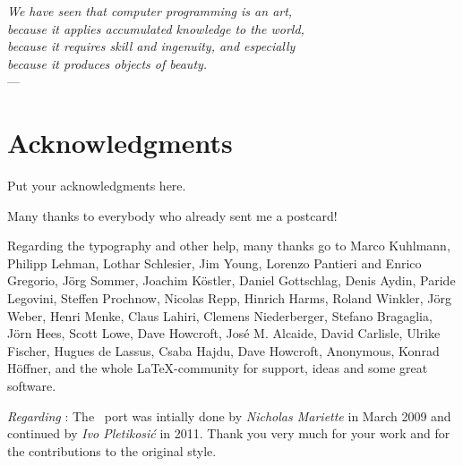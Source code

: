 
\begin{flushright}{\slshape
    We have seen that computer programming is an art, \\
    because it applies accumulated knowledge to the world, \\
    because it requires skill and ingenuity, and especially \\
    because it produces objects of beauty.} \\ \medskip
    --- \textcite{knuth:1974}\textcite{knuth:1974} \parencite{knuth:1974}
\end{flushright}



\bigskip

\begingroup
\let\clearpage\relax
\let\cleardoublepage\relax
\let\cleardoublepage\relax
\chapter*{Acknowledgments}

Put your acknowledgments here.

Many thanks to everybody who already sent me a postcard!

Regarding the typography and other help, many thanks go to Marco
Kuhlmann, Philipp Lehman, Lothar Schlesier, Jim Young, Lorenzo
Pantieri and Enrico Gregorio, J\"org Sommer,
Joachim K\"ostler, Daniel Gottschlag, Denis Aydin, Paride
Legovini, Steffen Prochnow, Nicolas Repp, Hinrich Harms,
Roland Winkler, Jörg Weber, Henri Menke, Claus Lahiri,
Clemens Niederberger, Stefano Bragaglia, Jörn Hees,
Scott Lowe, Dave Howcroft, Jos\'e M. Alcaide, David Carlisle,
Ulrike Fischer, Hugues de Lassus, Csaba Hajdu, Dave Howcroft,
Anonymous, Konrad Höffner, 
and the whole \LaTeX-community for support, ideas and
some great software.

\bigskip

\noindent\emph{Regarding \mLyX}: The \mLyX\ port was intially done by
\emph{Nicholas Mariette} in March 2009 and continued by
\emph{Ivo Pletikosi\'c} in 2011. Thank you very much for your
work and for the contributions to the original style.


\endgroup

